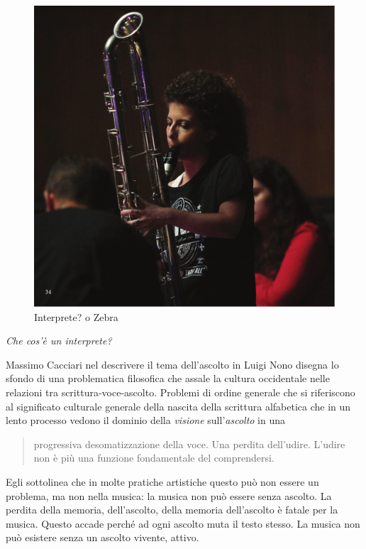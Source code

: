 \documentclass{gs-adonis}
\begin{document}
\begin{figure}[t]
  \centering
  \includegraphics[width=\linewidth]{images/panthera.pdf}
  \captionsetup{width=.81\linewidth}
  \caption{Interprete? o Zebra}
  \label{alice}
\end{figure}

\emph{Che cos'è un interprete?}

Massimo Cacciari nel descrivere il tema dell'ascolto in Luigi Nono
\cite{Cacciari1995} disegna lo sfondo di una problematica filosofica che assale
la cultura occidentale nelle relazioni tra scrittura-voce-ascolto. Problemi di
ordine generale che si riferiscono al significato culturale generale della
nascita della scrittura alfabetica che in un lento processo vedono il dominio
della \emph{visione} sull'\emph{ascolto} in una

\begin{quote}
  progressiva desomatizzazione della voce. Una perdita dell'udire. L'udire
  non è più una funzione fondamentale del comprendersi. \cite{Cacciari1995}
\end{quote}

Egli sottolinea che in molte pratiche artistiche questo può non essere un
problema, ma non nella musica: la musica non può essere senza ascolto.
La perdita della memoria, dell'ascolto, della memoria dell'ascolto è fatale
per la musica. Questo accade perché ad ogni ascolto muta il testo stesso.
La musica non può esistere senza un ascolto vivente, attivo.
\end{document}
